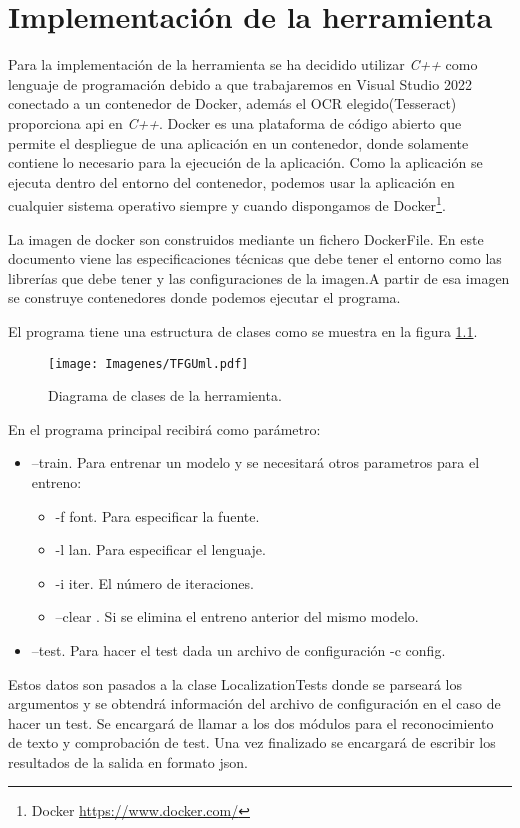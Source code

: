 \chapter{Implementación de la herramienta}
\label{cap:implementacion}

Para la implementación de la herramienta se ha decidido utilizar \emph{C++} como lenguaje de programación debido a que trabajaremos en Visual Studio 2022 conectado a un contenedor de Docker, además el OCR elegido(Tesseract) proporciona api en \emph{C++}. Docker es una plataforma de código abierto que permite el despliegue de una aplicación en un contenedor, donde solamente contiene lo necesario para la ejecución de la aplicación. Como la aplicación se ejecuta dentro del entorno del contenedor, podemos usar la aplicación en cualquier sistema operativo siempre y cuando dispongamos de Docker\footnote{Docker \url{https://www.docker.com/}}.

La imagen de docker son construidos mediante un fichero 
DockerFile. En este documento viene las especificaciones técnicas que debe tener el entorno como las librerías que debe tener y las configuraciones de la imagen.A partir de esa imagen se construye contenedores donde podemos ejecutar el programa.

El programa tiene una estructura de clases como se muestra en la figura \ref{fig:UML}.
\begin{figure}[H]
	\centering
	\texttt{[image: Imagenes/TFGUml.pdf]}
	\caption{Diagrama de clases de la herramienta.}
	\label{fig:UML}
\end{figure}

En el programa principal recibirá como parámetro:
\begin{itemize}
	\item --train. Para entrenar un modelo y se necesitará otros parametros para el entreno:
	\begin{itemize}
		\item -f font. Para especificar la fuente.
		\item -l lan. Para especificar el lenguaje.
		\item -i iter. El número de iteraciones.
		\item --clear . Si se elimina el entreno anterior del mismo modelo.
	\end{itemize}
	\item --test. Para hacer el test dada un archivo de configuración -c config.
\end{itemize}
Estos datos son pasados a la clase LocalizationTests donde se parseará los argumentos y se obtendrá información del archivo de configuración en el caso de hacer un test. Se encargará de llamar a los dos módulos para el reconocimiento de texto y comprobación de test. Una vez finalizado se encargará de escribir los resultados de la salida en formato json.

